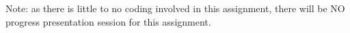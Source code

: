 \documentclass{pracs}
\begin{document}
Note: as there is little to no coding involved in this assignment, there will be NO progress presentation session for this assignment.

%
\end{document}
